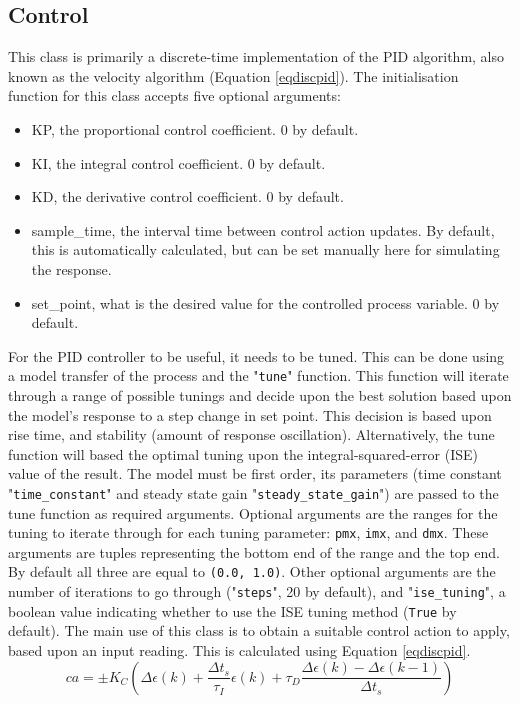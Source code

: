 \documentclass[twoside,a4]{report}
\def\br{\newline \newline \noindent}
\begin{document}
	\subsection*{Control} %
	This class is primarily a discrete-time implementation of the PID algorithm, also known as the velocity algorithm (Equation \ref{eqdiscpid}).\br
	The initialisation function for this class accepts five optional arguments:
	\begin{itemize}
		\item KP, the proportional control coefficient. 0 by default.
		\item KI, the integral control coefficient. 0 by default.
		\item KD, the derivative control coefficient. 0 by default.
		\item sample\_time, the interval time between control action updates. By default, this is automatically calculated, but can be set manually here for simulating the response.
		\item set\_point, what is the desired value for the controlled process variable. 0 by default.
	\end{itemize}
	For the PID controller to be useful, it needs to be tuned. This can be done using a model transfer of the process and the "\texttt{tune}" function. This function will iterate through a range of possible tunings and decide upon the best solution based upon the model's response to a step change in set point. This decision is based upon rise time, and stability (amount of response oscillation). Alternatively, the tune function will based the optimal tuning upon the integral-squared-error (ISE) value of the result. The model must be first order, its parameters (time constant "\texttt{time\_constant}" and steady state gain "\texttt{steady\_state\_gain}") are passed to the tune function as required arguments. Optional arguments are the ranges for the tuning to iterate through for each tuning parameter: \texttt{pmx}, \texttt{imx}, and \texttt{dmx}. These arguments are tuples representing the bottom end of the range and the top end. By default all three are equal to \texttt{(0.0, 1.0)}. Other optional arguments are the number of iterations to go through ("\texttt{steps}", 20 by default), and "\texttt{ise\_tuning}", a boolean value indicating whether to use the ISE tuning method (\texttt{True} by default). \br
	The main use of this class is to obtain a suitable control action to apply, based upon an input reading. This is calculated using Equation \ref{eqdiscpid}.
	\begin{equation}
	ca = \pm K_C \left(\Delta \epsilon (k) + \frac{\Delta t_s}{\tau _I}\epsilon (k) + \tau _D \frac{\Delta \epsilon(k) - \Delta \epsilon(k - 1)}{\Delta t_s}\right)
	\label{eqdiscpid}
	\end{equation}
	
\end{document}
